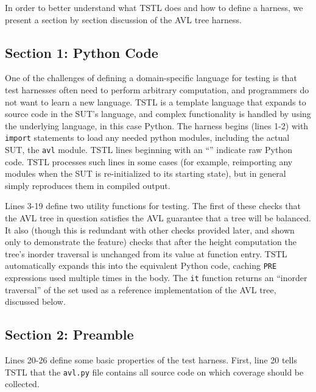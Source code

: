 \documentclass{sig-alternate}
\begin{document}
In order to better understand what TSTL does and how to define a
harness,  we present a section by section discussion of the AVL tree harness.

\subsection{Section 1: Python Code}

One of the challenges of defining a domain-specific language for
testing is that test harnesses often need to perform arbitrary
computation, and programmers do not want to learn a new language.
TSTL is a template language that expands to source code in the SUT's
language, and complex functionality is handled by using the underlying
language, in this case Python.  The harness begins (lines 1-2) with
{\tt import} statements to load any needed python modules, including
the actual SUT, the {\tt avl} module.  TSTL lines beginning with an
``\@'' indicate raw Python code.  TSTL processes such lines in some
cases (for example, reimporting any modules when the SUT is
re-initialized to its starting state), but in general simply
reproduces them in compiled output.  

Lines 3-19 define two utility functions for testing.  The first of
these checks that the AVL tree in question satisfies the AVL guarantee
that a tree will be balanced. It also (though this is redundant with
other checks provided later, and shown only to demonstrate the
feature) checks that after the height computation the tree's inorder
traversal is unchanged from its value at function entry.  TSTL
automatically expands this into the equivalent Python code, caching
{\tt PRE} expressions used multiple times in the body.  The {\tt it}
function returns an ``inorder traversal'' of the set used as a
reference implementation of the AVL tree, discussed below.

\subsection{Section 2: Preamble}

Lines 20-26 define some basic properties of the test harness.  First,
line 20 tells TSTL that the {\tt avl.py} file contains all source code
on which coverage should be collected.
\end{document}
